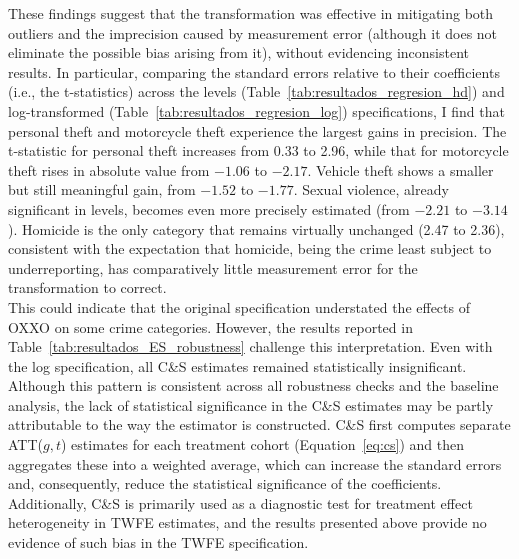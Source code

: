\documentclass[12pt]{article}
\begin{document}
These findings suggest that the transformation was effective in mitigating both outliers and the imprecision caused by measurement error (although it does not eliminate the possible bias arising from it), without evidencing inconsistent results. In particular, comparing the standard errors relative to their coefficients (i.e., the t-statistics) across the levels (Table~\ref{tab:resultados_regresion_hd}) and log-transformed (Table~\ref{tab:resultados_regresion_log}) specifications, I find that personal theft and motorcycle theft experience the largest gains in precision. The t-statistic for personal theft increases from 0.33 to 2.96, while that for motorcycle theft rises in absolute value from $-1.06$ to $-2.17$. Vehicle theft shows a smaller but still meaningful gain, from $-1.52$ to $-1.77$. Sexual violence, already significant in levels, becomes even more precisely estimated (from $-2.21$ to $-3.14$). Homicide is the only category that remains virtually unchanged (2.47 to 2.36), consistent with the expectation that homicide, being the crime least subject to underreporting, has comparatively little measurement error for the transformation to correct.\\

This could indicate that the original specification understated the effects of OXXO on some crime categories. However, the results reported in Table~\ref{tab:resultados_ES_robustness} challenge this interpretation. Even with the log specification, all C\&S estimates remained statistically insignificant. Although this pattern is consistent across all robustness checks and the baseline analysis, the lack of statistical significance in the C\&S estimates may be partly attributable to the way the estimator is constructed. C\&S first computes separate ATT($g,t$) estimates for each treatment cohort (Equation~\ref{eq:cs}) and then aggregates these into a weighted average, which can increase the standard errors and, consequently, reduce the statistical significance of the coefficients. Additionally, C\&S is primarily used as a diagnostic test for treatment effect heterogeneity in TWFE estimates, and the results presented above provide no evidence of such bias in the TWFE specification.\\
\end{document}
